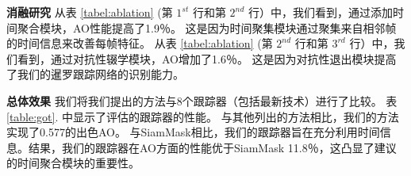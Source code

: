 \textbf{消融研究}
从表 \ref{tabel:ablation} (第 $1^{st}$ 行和第 $2^{nd}$ 行）中，我们看到，通过添加时间聚合模块，AO性能提高了1.9％。
这是因为时间聚集模块通过聚集来自相邻帧的时间信息来改善每帧特征。
从表 \ref{tabel:ablation} (第 $2^{nd}$ 行和第 $3^{rd}$ 行）中，我们看到，通过对抗性辍学模块，AO增加了1.6％。
这是因为对抗性退出模块提高了我们的暹罗跟踪网络的识别能力。

\textbf{总体效果}
我们将我们提出的方法与8个跟踪器（包括最新技术）进行了比较。
表 \ref{table:got}.
中显示了评估的跟踪器的性能。
与其他列出的方法相比，我们的方法实现了0.577的出色AO。
与SiamMask相比，我们的跟踪器旨在充分利用时间信息。结果，我们的跟踪器在AO方面的性能优于SiamMask 11.8％，这凸显了建议的时间聚合模块的重要性。

